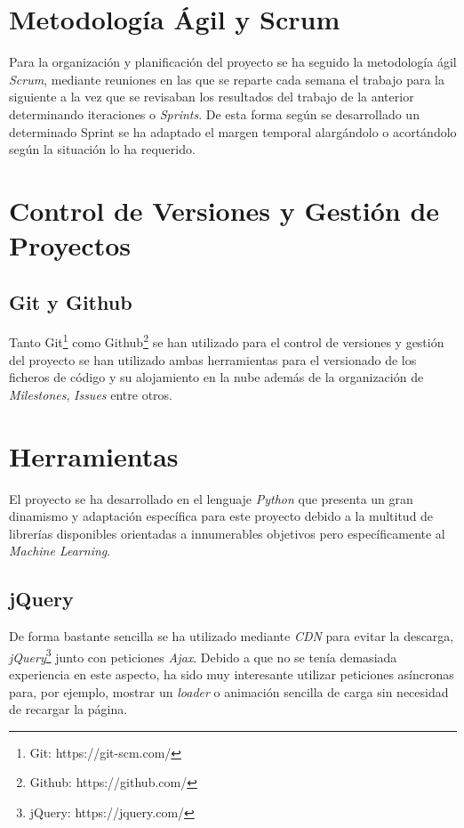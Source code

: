 
\section{Metodología Ágil y Scrum}

Para la organización y planificación del proyecto se ha seguido la metodología ágil \emph{Scrum}, mediante reuniones en las que se reparte cada semana el trabajo para la siguiente a la vez que se revisaban los resultados del trabajo de la anterior determinando iteraciones o \emph{Sprints}. De esta forma según se desarrollado un determinado Sprint se ha adaptado el margen temporal alargándolo o acortándolo según la situación lo ha requerido.

\section{Control de Versiones y Gestión de Proyectos}

\subsection{Git y Github} 

Tanto Git\footnote{Git: https://git-scm.com/} como Github\footnote{Github: https://github.com/} se han utilizado para el control de versiones y gestión del proyecto se han utilizado ambas herramientas para el versionado de los ficheros de código y su alojamiento en la nube además de la organización de \emph{Milestones}, \emph{Issues} entre otros.
\clearpage

\section{Herramientas}

El proyecto se ha desarrollado en el lenguaje \emph{Python} que presenta un gran dinamismo y adaptación específica para este proyecto debido a la multitud de librerías disponibles orientadas a innumerables objetivos pero específicamente al \emph{Machine Learning}.

\subsection{jQuery}
De forma bastante sencilla se ha utilizado mediante \emph{CDN} para evitar la descarga, \emph{jQuery}\footnote{jQuery: https://jquery.com/} junto con peticiones \emph{Ajax}. Debido a que no se tenía demasiada experiencia en este aspecto, ha sido muy interesante utilizar peticiones asíncronas para, por ejemplo, mostrar un \emph{loader} o animación sencilla de carga sin necesidad de recargar la página. 

